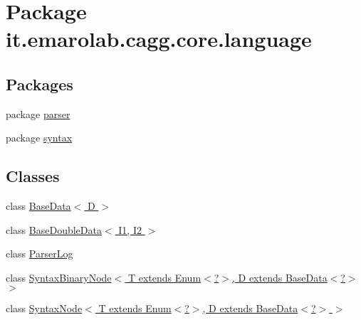 \hypertarget{namespaceit_1_1emarolab_1_1cagg_1_1core_1_1language}{\section{Package it.\-emarolab.\-cagg.\-core.\-language}
\label{namespaceit_1_1emarolab_1_1cagg_1_1core_1_1language}
}
\subsection*{Packages}
\begin{DoxyCompactItemize}
\item 
package \hyperlink{namespaceit_1_1emarolab_1_1cagg_1_1core_1_1language_1_1parser}{parser}
\item 
package \hyperlink{namespaceit_1_1emarolab_1_1cagg_1_1core_1_1language_1_1syntax}{syntax}
\end{DoxyCompactItemize}
\subsection*{Classes}
\begin{DoxyCompactItemize}
\item 
class \hyperlink{classit_1_1emarolab_1_1cagg_1_1core_1_1language_1_1BaseData_3_01D_01_4}{Base\-Data$<$ D $>$}
\item 
class \hyperlink{classit_1_1emarolab_1_1cagg_1_1core_1_1language_1_1BaseDoubleData_3_01I1_00_01I2_01_4}{Base\-Double\-Data$<$ I1, I2 $>$}
\item 
class \hyperlink{classit_1_1emarolab_1_1cagg_1_1core_1_1language_1_1ParserLog}{Parser\-Log}
\item 
class \hyperlink{classit_1_1emarolab_1_1cagg_1_1core_1_1language_1_1SyntaxBinaryNode_3_01T_01extends_01Enum_3_04_6f6f52bca8b05a51e94968cedaccd1f1}{Syntax\-Binary\-Node$<$ T extends Enum$<$?$>$, D extends Base\-Data$<$?$>$ $>$}
\item 
class \hyperlink{classit_1_1emarolab_1_1cagg_1_1core_1_1language_1_1SyntaxNode_3_01T_01extends_01Enum_3_04_4_00_0ad1119718731d7a79caa8c8c39688664}{Syntax\-Node$<$ T extends Enum$<$?$>$, D extends Base\-Data$<$?$>$ $>$}
\end{DoxyCompactItemize}
